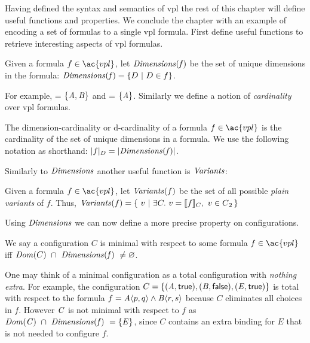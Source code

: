 \label{section:vpl:formalism}
%
Having defined the syntax and semantics of \ac{vpl} the rest of this chapter
will define useful functions and properties. We conclude the chapter with an
example of encoding a set of \pl{} formulas to a single \ac{vpl} formula.
%
First define useful functions to retrieve interesting aspects of \ac{vpl}
formulas.

\begin{definition}[Dimensions]
  Given a formula $f \in \ac{vpl}$, let $\mathit{Dimensions(f)}$ be the set of unique
  dimensions in the formula:  $\mathit{Dimensions(f)} = \{ D\ |\ D \in f \}$.
\end{definition}

For example,  = $\{\mathit{A,B}\}$ and
 = $\{\mathit{A}\}$.
%
Similarly we define a notion of \emph{cardinality} over \ac{vpl} formulas.
%
\begin{definition}
  The dimension-cardinality or d-cardinality of a formula $f \in \ac{vpl}$ is
  the cardinality of the set of unique dimensions in a formula. We use the
  following notation as shorthand: $|f|_{D} = |{\mathit{Dimensions(f)}}|$.
\end{definition}

Similarly to $\mathit{Dimensions}$ another useful function is $\mathit{Variants}$:

\begin{definition}[Variants]
  Given a formula $f \in \ac{vpl}$, let $\mathit{Variants}(f)$ be the set of all
  possible \emph{plain variants} of $f$. Thus, $\variants{f} = \{\ v\ |\ \exists C.\
  v = \sem[C]{f},\ v \in \pl{} \,\}$
\end{definition}

Using $\mathit{Dimensions}$ we can now define a more precise property on
configurations.
%
\begin{definition}
  We say a configuration $C$ is minimal with respect to some formula $f \in
  \ac{vpl}$ iff $\domain{C}\ \cap\ \kf{Dimensions(\kf{f})\ \neq \varnothing}$.
\end{definition}

One may think of a minimal configuration as a total configuration with
\emph{nothing extra}. For example, the configuration $C = \{\kf{(A,\true),
  (B,\false),(E,\true)}\}$ is total with respect to the formula $f =
\chc[A]{p,q}\wedge\chc[B]{r,s}$ because $C$ eliminates all choices in $f$.
However $\mathit{C}$ is not minimal with respect to $f$ as $\mathit{Dom(C)}\ \cap\
\mathit{Dimensions(\mathit{f})\ = \{\mathit{E}\}}$, since $C$ contains an extra binding for
$E$ that is not needed to configure $f$.

